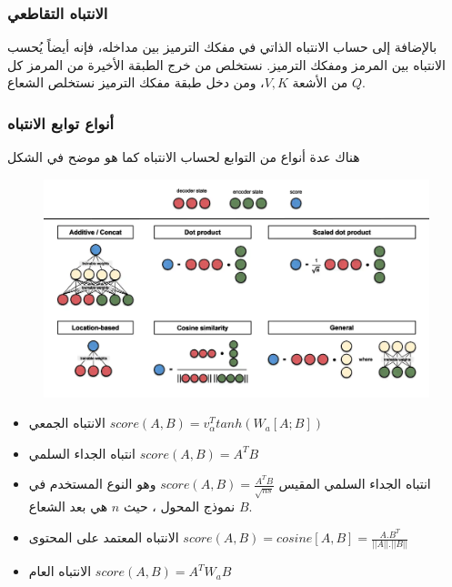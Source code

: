 \subsubsection{الانتباه التقاطعي
\label{MCHA}}
بالإضافة إلى حساب الانتباه الذاتي في مفكك الترميز
بين مداخله، فإنه أيضاً يُحسب
الانتباه بين المرمز ومفكك الترميز. نستخلص من خرج الطبقة الأخيرة من المرمز كل من الأشعة 
$V,K$،
ومن دخل طبقة مفكك الترميز نستخلص الشعاع 
$Q$.
\subsubsection{أنواع توابع الانتباه
}
هناك عدة أنواع من التوابع لحساب
 الانتباه كما هو موضح في الشكل
\textLR{\ref{fig:att_types}}
 \begin{figure}[h!]
 	\centerline{\includegraphics[width=\textwidth]{images/attention_types}}
 	\caption{
 	}
 	\label{fig:att_types}
 \end{figure}

\begin{itemize}
	\item الانتباه الجمعي 
	$score(A,B) = v_\alpha^T tanh(W_a[A;B])$
	\item
	انتباه الجداء السلمي 
	$score(A,B) = A^TB$
	\item
	انتباه الجداء السلمي المقيس
	$score(A,B) = \frac{A^TB}{\sqrt{ns}}$
	وهو النوع المستخدم في نموذج المحول 
	،
	حيث
	$n$
	هي بعد الشعاع
	$B$.
	\item الانتباه المعتمد على المحتوى
	$score(A,B) = cosine[A,B] = \frac{A.B^T}{||A||.||B||}$ 
	
	\item
	الانتباه العام
	$score(A,B) = A^TW_aB$


	
\end{itemize}